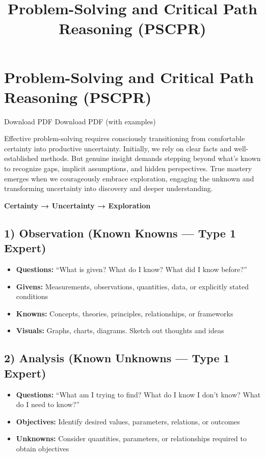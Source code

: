 \documentclass[
  letterpaper,
  DIV=11,
  numbers=noendperiod]{scrartcl}
\title{Problem-Solving and Critical Path Reasoning (PSCPR)}
\author{}
\date{}
\providecommand{\tightlist}{%
  \setlength{\itemsep}{0pt}\setlength{\parskip}{0pt}}
\begin{document}
\maketitle


\section{Problem-Solving and Critical Path Reasoning
(PSCPR)}\label{problem-solving-and-critical-path-reasoning-pscpr}

Download PDF Download PDF (with examples)

Effective problem-solving requires consciously transitioning from
comfortable certainty into productive uncertainty. Initially, we rely on
clear facts and well-established methods. But genuine insight demands
stepping beyond what's known to recognize gaps, implicit assumptions,
and hidden perspectives. True mastery emerges when we courageously
embrace exploration, engaging the unknown and transforming uncertainty
into discovery and deeper understanding.

\textbf{Certainty → Uncertainty → Exploration}

\subsection{1) Observation (Known Knowns --- Type 1
Expert)}\label{observation-known-knowns-type-1-expert}

\begin{itemize}
\tightlist
\item
  \textbf{Questions:} ``What is given? What do I know? What did I know
  before?''
\item
  \textbf{Givens:} Measurements, observations, quantities, data, or
  explicitly stated conditions
\item
  \textbf{Knowns:} Concepts, theories, principles, relationships, or
  frameworks
\item
  \textbf{Visuals:} Graphs, charts, diagrams. Sketch out thoughts and
  ideas
\end{itemize}

\subsection{2) Analysis (Known Unknowns --- Type 1
Expert)}\label{analysis-known-unknowns-type-1-expert}

\begin{itemize}
\tightlist
\item
  \textbf{Questions:} ``What am I trying to find? What do I know I don't
  know? What do I need to know?''
\item
  \textbf{Objectives:} Identify desired values, parameters, relations,
  or outcomes
\item
  \textbf{Unknowns:} Consider quantities, parameters, or relationships
  required to obtain objectives
\end{itemize}
\end{document}
